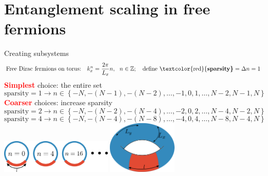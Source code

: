 \documentclass[11pt,aspectratio=169]{beamer}
\newcommand{\focus}[1]{\textcolor{red}{\bf{#1}}}
\begin{document}
\section{Entanglement scaling in free fermions}

\begin{frame}{Creating subsystems}
	\[\text{Free Dirac fermions on torus:}~ ~ ~ k_x^n = \frac{2\pi }{L_x} n,~ ~ n \in \mathbb{Z};~~~ \text{define \focus{sparsity}} = \Delta n = 1\]
	\focus{Simplest} choice: the entire set
	\[\text{sparsity} = 1 \longrightarrow n \in \left\{-N,-(N-1),-(N-2),\ldots,-1,0,1,\ldots,N-2,N-1,N\right\} \]
	\focus{Coarser} choices: increase sparsity
	\[\text{sparsity} = 2 \longrightarrow n \in \left\{-N,-(N-2),-(N-4),\ldots,-2,0,2,\ldots,N-4,N-2,N\right\} \]
	\[\text{sparsity} = 4 \longrightarrow n \in \left\{-N,-(N-4),-(N-8),\ldots,-4,0,4,\ldots,N-8,N-4,N\right\} \]
	\centering
	\vspace*{\fill}
	\includegraphics[width=0.4\textwidth]{figures/A_mi.pdf}
	\hspace*{\fill}
	\includegraphics[width=0.25\textwidth]{figures/subsystem-torus.pdf}
\end{frame}
\end{document}
